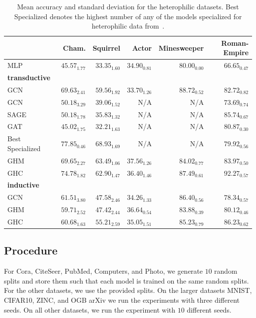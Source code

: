 \documentclass[conference]{IEEEtran}
\begin{document}
\begin{table}
\centering
\caption{Mean accuracy and standard deviation for the heterophilic datasets. Best Specialized denotes the highest number of any of the models specialized for heterophilic data from~\citet{heter}.}
\label{tab:results_he}
\begin{tabular}{l|rrr|rr} \toprule
& Cham. & Squirrel & Actor & Minesweeper & Roman-Empire  \\ \midrule
MLP & $45.57_{1.77}$ &$33.35_{1.60}$ & $34.90_{0.81}$ & $80.00_{0.00}$ & $66.65_{0.47}$ \\  \midrule \midrule
\textbf{transductive} \\ 
GCN  & $69.63_{2.41}$ & $59.56_{1.92}$ & $33.70_{1.26}$ & $\mathbf{88.72_{0.52}}$  & $82.72_{0.82}$ \\ 
GCN~\cite{heter} & $50.18_{3.29}$ & $39.06_{1.52}$ & N/A & N/A & $73.69_{0.74}$ \\
SAGE~\cite{heter} & $50.18_{1.78}$ & $35.83_{1.32}$ & N/A & N/A & $85.74_{0.67}$  \\
GAT~\cite{heter} & $45.02_{1.75}$ & $32.21_{1.63}$ & N/A & N/A & $80.87_{0.30}$ \\
Best Specialized~\cite{heter} & $\mathbf{77.85_{0.46}}$ & $\mathbf{68.93_{1.69}}$ & N/A & N/A & $79.92_{0.56}$ \\
\midrule
GHM & $69.65_{2.27}$ & $63.49_{1.06}$ & $\mathbf{37.56_{1.26}}$ & $84.02_{0.77}$ & $83.97_{0.50}$ \\ 
GHC & $74.78_{1.82}$ & $62.90_{1.47}$ & $36.40_{1.46}$ & $87.49_{0.61}$ & $\mathbf{92.27_{0.57}}$\\ \midrule \midrule
\textbf{inductive} \\
GCN & $\mathbf{61.51_{3.80}}$ & $47.58_{2.46}$ & $34.26_{1.33}$ & $\mathbf{86.40_{0.56}}$ & $78.34_{0.57}$  \\
GHM & $59.71_{2.52}$ & $47.42_{2.44}$ & $\mathbf{36.64_{0.54}}$  & $83.88_{0.39}$ & $80.12_{0.46}$  \\ 
GHC & $60.68_{1.63}$ & $\mathbf{55.21_{2.59}}$ & $35.05_{1.51}$ & $85.23_{0.79}$ & $\mathbf{86.23_{0.62}}$  \\ \bottomrule
\end{tabular}
\end{table}




\subsection{Procedure}
\label{sec:procedure}
For Cora, CiteSeer, PubMed, Computers, and Photo, we generate $10$ random splits and store them such that each model is trained on the same random splits.
For the other datasets, we use the provided splits.
On the larger datasets MNIST, CIFAR10, ZINC, and OGB arXiv we run the experiments with three different seeds.
On all other datasets, we run the experiment with $10$ different seeds.
\end{document}
